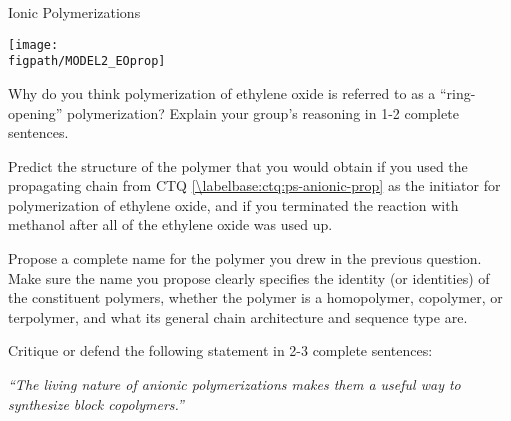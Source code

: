 \begin{activity}{Ionic Polymerizations}
\begin{model}
	\centerline{\texttt{[image: \\figpath/MODEL2\_EOprop]}}

\end{model}

\begin{ctqs}
	
	\question Why do you think polymerization of ethylene oxide is referred to as a ``ring-opening'' polymerization?  Explain your group's reasoning in 1-2 complete sentences.
	
		\begin{solution}[1in]
		\end{solution}
	
	\question Predict the structure of the polymer that you would obtain if you used the propagating chain from CTQ \ref{\labelbase:ctq:ps-anionic-prop} as the initiator for polymerization of ethylene oxide, and if you terminated the reaction with methanol after all of the ethylene oxide was used up.
	
		\begin{solution}[1.5in]
		\end{solution}
	
	\question Propose a complete name for the polymer you drew in the previous question.  Make sure the name you propose clearly specifies the identity (or identities) of the constituent polymers, whether the polymer is a homopolymer, copolymer, or terpolymer, and what its general chain architecture and sequence type are. 
	
		\begin{solution}[1.5in]
		\end{solution}
		
	\question Critique or defend the following statement in 2-3 complete sentences:
	
		\emph{``The living nature of anionic polymerizations makes them a useful way to synthesize block copolymers.''}
		
		\begin{solution}[1.5in]
		\end{solution}
	
\end{ctqs}




	


%
%	


	
\end{activity}